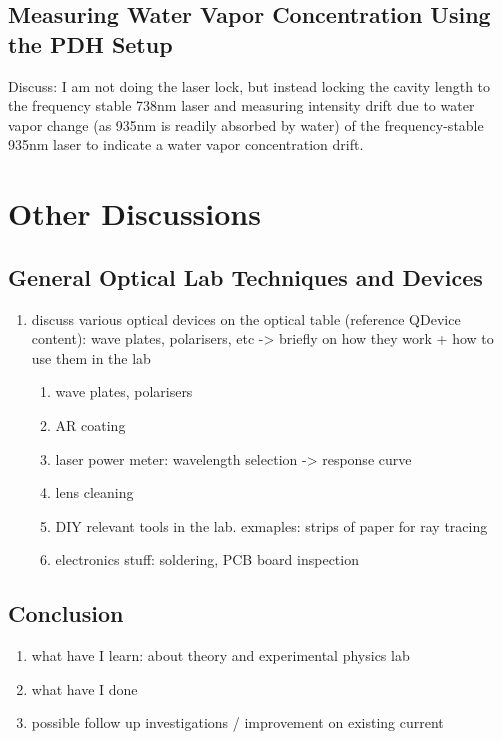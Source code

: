 \documentclass[12pt]{report}
\begin{document}
\section{Measuring Water Vapor Concentration Using the PDH Setup}
Discuss: I am not doing the laser lock, but instead locking the cavity length to the frequency stable 738nm laser and measuring intensity drift due to water vapor change (as 935nm is readily absorbed by water) of the frequency-stable 935nm laser to indicate a water vapor concentration drift. 

\chapter{Other Discussions}
\section{General Optical Lab Techniques and Devices}
\begin{enumerate}
    \item discuss various optical devices on the optical table (reference QDevice content): wave plates, polarisers, etc -> briefly on how they work + how to use them in the lab 
    \begin{enumerate}
        \item wave plates, polarisers
        \item AR coating
        \item laser power meter: wavelength selection -> response curve
        \item lens cleaning
        \item DIY relevant tools in the lab. exmaples: strips of paper for ray tracing
        \item electronics stuff: soldering, PCB board inspection
        
    \end{enumerate}
\end{enumerate}




\section{Conclusion}
\begin{enumerate}
    \item what have I learn: about theory and experimental physics lab
    \item what have I done 
    \item possible follow up investigations / improvement on existing current
\end{enumerate}
\end{document}
